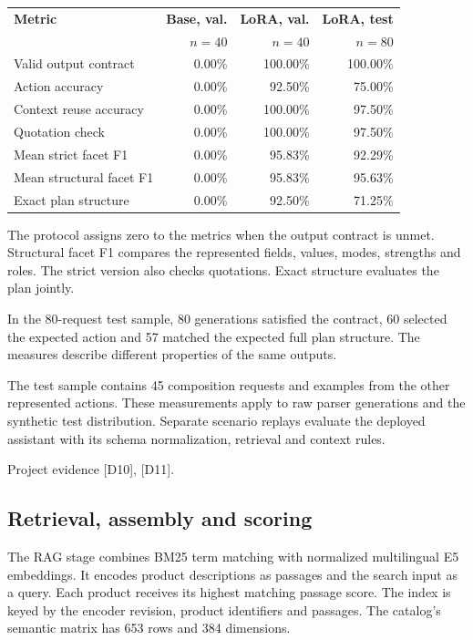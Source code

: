 \documentclass[11pt,a4paper]{article}
\newcommand{\src}[1]{\par{\footnotesize\textcolor{muted}{Project evidence #1.}}\par}
\newcommand{\panel}[1]{\par\smallskip\noindent\colorbox{mist}{\parbox{\dimexpr\linewidth-2\fboxsep\relax}{\vspace{4pt}\small #1\vspace{4pt}}}\par\smallskip}
\begin{document}
\begin{tabularx}{\linewidth}{@{}Yrrr@{}}
\toprule
\textbf{Metric} & \textbf{Base, val.} & \textbf{LoRA, val.} & \textbf{LoRA, test} \\
 & \textbf{\(n=40\)} & \textbf{\(n=40\)} & \textbf{\(n=80\)} \\
\midrule
Valid output contract & 0.00\% & 100.00\% & 100.00\% \\
Action accuracy & 0.00\% & 92.50\% & 75.00\% \\
Context reuse accuracy & 0.00\% & 100.00\% & 97.50\% \\
Quotation check & 0.00\% & 100.00\% & 97.50\% \\
Mean strict facet F1 & 0.00\% & 95.83\% & 92.29\% \\
Mean structural facet F1 & 0.00\% & 95.83\% & 95.63\% \\
Exact plan structure & 0.00\% & 92.50\% & 71.25\% \\
\bottomrule
\end{tabularx}

The protocol assigns zero to the metrics when the output contract is unmet. Structural facet F1 compares the represented fields, values, modes, strengths and roles. The strict version also checks quotations. Exact structure evaluates the plan jointly.

\panel{In the 80-request test sample, 80 generations satisfied the contract, 60 selected the expected action and 57 matched the expected full plan structure. The measures describe different properties of the same outputs.}

The test sample contains 45 composition requests and examples from the other represented actions. These measurements apply to raw parser generations and the synthetic test distribution. Separate scenario replays evaluate the deployed assistant with its schema normalization, retrieval and context rules.
\src{[D10], [D11]}

\clearpage
\subsection*{Retrieval, assembly and scoring}
The RAG stage combines BM25 term matching with normalized multilingual E5 embeddings. It encodes product descriptions as passages and the search input as a query. Each product receives its highest matching passage score. The index is keyed by the encoder revision, product identifiers and passages. The catalog's semantic matrix has 653 rows and 384 dimensions. \cite{wang2024}
\end{document}
